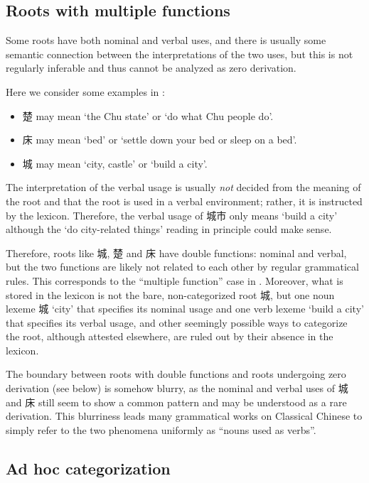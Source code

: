 \documentclass[UTF8, a4paper, oneside, scheme=plain, 12pt]{ctexrep}
\newcommand*{\citesec}[1]{\S~{#1}}
\newcommand{\translate}[1]{`#1'}
\begin{document}
\subsection{Roots with multiple functions}

Some roots have both nominal and verbal uses,
and there is usually some semantic connection between the interpretations of the two uses,
but this is not regularly inferable and thus cannot be analyzed as zero derivation.

Here we consider some examples in \citet{yang1991dict}:
\begin{itemize}
    \item 楚 may mean \translate{the Chu state} or \translate{do what Chu people do}.
    \item 床 may mean \translate{bed} or \translate{settle down your bed or sleep on a bed}.
    \item 城 may mean \translate{city, castle} or \translate{build a city}.
\end{itemize}

The interpretation of the verbal usage is usually \emph{not} decided
from the meaning of the root and that the root is used in a verbal environment;
rather, it is instructed by the lexicon.
Therefore, the verbal usage of 城市 only means \translate{build a city}
although the \translate{do city-related things} reading in principle could make sense. 

Therefore, roots like 城, 楚 and 床 have double functions: nominal and verbal,
but the two functions are likely not related to each other by regular grammatical rules.
This corresponds to the ``multiple function'' case in \citet[\citesec{11.3}]{dixon2010basic2}.
Moreover, what is stored in the lexicon is not the bare, non-categorized root 城,
but one noun lexeme 城 \translate{city} that specifies its nominal usage 
and one verb lexeme \translate{build a city} that specifies its verbal usage,
and other seemingly possible ways to categorize the root, although attested elsewhere,
are ruled out by their absence in the lexicon.

The boundary between roots with double functions and roots undergoing zero derivation (see below) 
is somehow blurry,
as the nominal and verbal uses of 城 and 床 still seem to show a common pattern
and may be understood as a rare derivation.
This blurriness leads many grammatical works on Classical Chinese 
to simply refer to the two phenomena uniformly as ``nouns used as verbs''.

\subsection{Ad hoc categorization}
\end{document}
